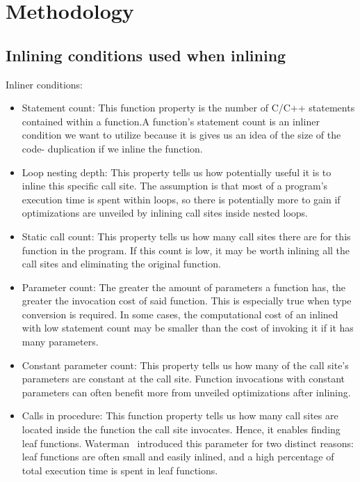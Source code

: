 
\clearpage
\section{Methodology}
\label{sec:methodology}


\subsection{Inlining conditions used when inlining}

Inliner conditions:

\begin{itemize}

	\item Statement count: This function property is the number of C/C++
statements contained within a function.A function's statement count is an
inliner condition we want to utilize because it is gives us an idea of the size
of the code- duplication if we inline the function.

	\item Loop nesting depth: This property tells us how potentially useful it
is to inline this specific call site. The assumption is that most of a program's
execution time is spent within loops, so there is potentially more to gain if
optimizations are unveiled by inlining call sites inside nested loops.

	\item Static call count: This property tells us how many call sites there
are for this function in the program. If this count is low, it may be worth
inlining all the call sites and eliminating the original function.

	\item Parameter count: The greater the amount of parameters a function has,
the greater the invocation cost of said function. This is especially true when
type conversion is required. In some cases, the computational cost of an inlined
with low statement count may be smaller than the cost of invoking it if it has
many parameters\cite{AdaptvCompilAndInlingWaterman}.

	\item Constant parameter count: This property tells us how many of the call
site's parameters are constant at the call site. Function invocations with
constant parameters can often benefit more from unveiled optimizations after
inlining.

	\item Calls in procedure: This function property tells us how many call
sites are located inside the function the call site invocates. Hence, it enables
finding leaf functions. Waterman~\cite{AdaptvCompilAndInlingWaterman} introduced
this parameter for two distinct reasons: leaf functions are often small and
easily inlined, and a high percentage of total execution time is spent in leaf
functions.

\end{itemize}
